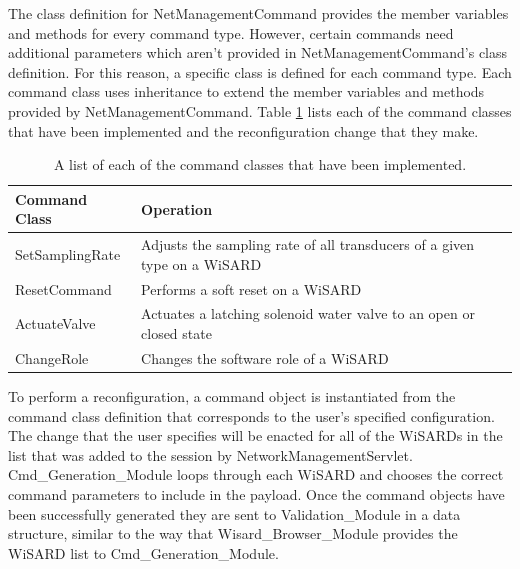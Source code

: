 The class definition for NetManagementCommand provides the member variables and methods for every command type. However, certain commands need additional parameters which aren't provided in NetManagementCommand's class definition. For this reason, a specific class is defined for each command type. Each command class uses inheritance to extend the member variables and methods provided by NetManagementCommand. Table \ref{tab:commands} lists each of the command classes that have been implemented and the reconfiguration change that they make.\\

\begin{table}[H]
	\centering
	\renewcommand{\arraystretch}{1.1}
	\begin{tabular}{|p{3cm}|p{11cm}|}
	\hline
	Command Class & Operation\\
	\hline
	SetSamplingRate & Adjusts the sampling rate of all transducers of a given type on a WiSARD\\
	\hline
	ResetCommand & Performs a soft reset on a WiSARD\\
	\hline
	ActuateValve & Actuates a latching solenoid water valve to an open or closed state\\
	\hline
	ChangeRole & Changes the software role of a WiSARD \\
	\hline
	\end{tabular}
	\caption{A list of each of the command classes that have been implemented.}
	\label{tab:commands}
\end{table}

To perform a reconfiguration, a command object is instantiated from the command class definition that corresponds to the user's specified configuration. The change that the user specifies will be enacted for all of the WiSARDs in the list that was added to the session by NetworkManagementServlet. Cmd\_Generation\_Module loops through each WiSARD and chooses the correct command parameters to include in the payload. Once the command objects have been successfully generated they are sent to Validation\_Module in a data structure, similar to the way that Wisard\_Browser\_Module provides the WiSARD list to Cmd\_Generation\_Module.



